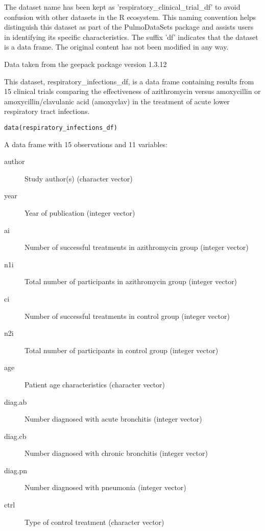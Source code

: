 \documentclass[a4paper]{book}
\begin{document}
%
\begin{Details}
The dataset name has been kept as 'respiratory\_clinical\_trial\_df' to avoid confusion with other datasets
in the R ecosystem. This naming convention helps distinguish this dataset as part of the
PulmoDataSets package and assists users in identifying its specific characteristics.
The suffix 'df' indicates that the dataset is a data frame. The original content has not been modified
in any way.
\end{Details}
%
\begin{Source}
Data taken from the geepack package version 1.3.12
\end{Source}
%
\begin{Description}
This dataset, respiratory\_infections\_df, is a data frame containing results from 15 clinical trials
comparing the effectiveness of azithromycin versus amoxycillin or amoxycillin/clavulanic acid (amoxyclav)
in the treatment of acute lower respiratory tract infections.
\end{Description}
%
\begin{Usage}
\begin{verbatim}
data(respiratory_infections_df)
\end{verbatim}
\end{Usage}
%
\begin{Format}
A data frame with 15 observations and 11 variables:
\begin{description}

\item[author] Study author(s) (character vector)
\item[year] Year of publication (integer vector)
\item[ai] Number of successful treatments in azithromycin group (integer vector)
\item[n1i] Total number of participants in azithromycin group (integer vector)
\item[ci] Number of successful treatments in control group (integer vector)
\item[n2i] Total number of participants in control group (integer vector)
\item[age] Patient age characteristics (character vector)
\item[diag.ab] Number diagnosed with acute bronchitis (integer vector)
\item[diag.cb] Number diagnosed with chronic bronchitis (integer vector)
\item[diag.pn] Number diagnosed with pneumonia (integer vector)
\item[ctrl] Type of control treatment (character vector)

\end{description}

\end{Format}
\end{document}
